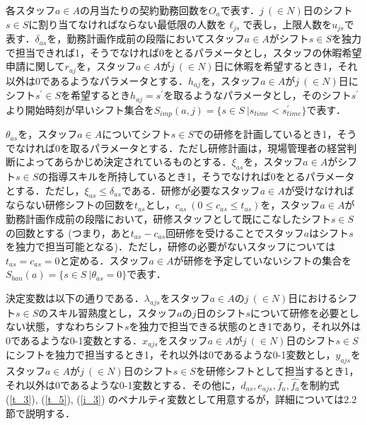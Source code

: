 \documentclass[twocolumn]{jsarticle}
\begin{document}
各スタッフ$a \in A$の月当たりの契約勤務回数を$O_a$で表す．$j \ (\in N)$日のシフト$s \in S$に割り当てなければならない最低限の人数を$\ell_{js}$で表し，上限人数を$u_{js}$で表す．$\delta_{as}$を，勤務計画作成前の段階においてスタッフ$a \in A$がシフト$s \in S$を独力で担当できれば1，そうでなければ0をとるパラメータとし，スタッフの休暇希望申請に関して$r_{aj}$を，スタッフ$a \in A$が$j \ (\in N)$日に休暇を希望するとき1，それ以外は0であるようなパラメータとする．$h_{aj}$を，スタッフ$a \in A$が$j \ (\in N)$日にシフト$s^{\prime} \in S$を希望するとき$h_{aj} = s^{\prime}$を取るようなパラメータとし，そのシフト$s^{\prime}$より開始時刻が早いシフト集合を$S_{imp}(a, j) = \{s \in S \ |s_{time} < s_{time}^{\prime} \}$で表す．

$\theta_{as}$を，スタッフ$a \in A$についてシフト$s \in S$での研修を計画しているとき1，そうでなければ0を取るパラメータとする．ただし研修計画は，現場管理者の経営判断によってあらかじめ決定されているものとする．$\xi_{as}$を，スタッフ$a \in A$がシフト$s \in S$の指導スキルを所持しているとき1，そうでなければ0をとるパラメータとする．ただし，$\xi_{as} \leq \delta_{as}$である．研修が必要なスタッフ$a \in A$が受けなければならない研修シフトの回数を$t_{as}$とし，$c_{as} \ (0 \leq c_{as} \leq t_{as})$を，スタッフ$a \in A$が勤務計画作成前の段階において，研修スタッフとして既にこなしたシフト$s \in S$の回数とする (つまり，あと$t_{as} - c_{as}$回研修を受けることでスタッフ$a$はシフト$s$を独力で担当可能となる)．ただし，研修の必要がないスタッフについては$t_{as} = c_{as} = 0$と定める．スタッフ$a \in A$が研修を予定していないシフトの集合を$S_{ban}(a) = \{ s \in S \ | \theta_{as} = 0 \}$で表す．

決定変数は以下の通りである．$\lambda_{ajs}$をスタッフ$a \in A$の$j \ (\in N)$日におけるシフト$s \in S$のスキル習熟度とし，スタッフ$a$の$j$日のシフト$s$について研修を必要としない状態，すなわちシフト$s$を独力で担当できる状態のとき1であり，それ以外は0であるような0-1変数とする．$x_{ajs}$をスタッフ$a \in A$が$j \ (\in N)$日のシフト$s \in S$にシフトを独力で担当するとき1，それ以外は0であるような0-1変数とし，$y_{ajs}$をスタッフ$a \in A$が$j \ (\in N)$日のシフト$s \in S$を研修シフトとして担当するとき1，それ以外は0であるような0-1変数とする．その他に，$d_{as}, e_{ajs}, \check{f_a}, \hat{f_a} $を制約式 (\ref{t_3}), (\ref{t_5}), (\ref{i_3}) のペナルティ変数として用意するが，詳細については2.2節で説明する．

\vspace{\baselineskip}
\end{document}
